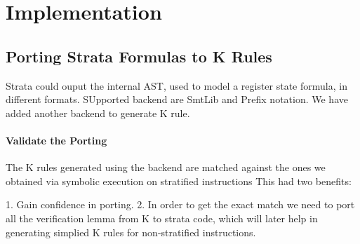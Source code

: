 \section{Implementation}

\subsection{Porting Strata Formulas to K Rules}

Strata could ouput the internal AST, used to model a register state formula, in different
formats. SUpported backend are SmtLib and Prefix notation. We have added another backend 
to generate K rule.

\paragraph{Validate the Porting}
The K rules generated using the backend are matched against the ones we
obtained via symbolic execution on stratified instructions
This had two benefits:
 
 1. Gain confidence in porting.  
 2. In order to get the exact match we need to port all the verification lemma
 from K to strata code, which will later help in generating simplied K rules for
 non-stratified instructions.

